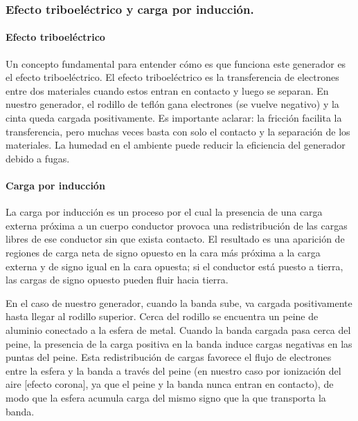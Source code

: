 \documentclass[12pt]{article}
\begin{document}
\subsubsection*{Efecto triboeléctrico y carga por inducción.}
\paragraph*{Efecto triboeléctrico}\mbox{}

Un concepto fundamental para entender cómo es que funciona este generador es el efecto triboeléctrico. El efecto triboeléctrico es la transferencia de electrones entre dos materiales cuando estos entran en contacto y luego se separan. En nuestro generador, el rodillo de teflón gana electrones (se vuelve negativo) y la cinta queda cargada positivamente. Es importante aclarar: la fricción facilita la transferencia, pero muchas veces basta con solo el contacto y la separación de los materiales. La humedad en el ambiente puede reducir la eficiencia del generador debido a fugas.

\paragraph*{Carga por inducción}\mbox{}
La carga por inducción es un proceso por el cual la presencia de una carga externa próxima a un cuerpo conductor provoca una redistribución de las cargas libres de ese conductor sin que exista contacto. El resultado es una aparición de regiones de carga neta de signo opuesto en la cara más próxima a la carga externa y de signo igual en la cara opuesta; si el conductor está puesto a tierra, las cargas de signo opuesto pueden fluir hacia tierra.

En el caso de nuestro generador, cuando la banda sube, va cargada positivamente hasta llegar al rodillo superior. Cerca del rodillo se encuentra un peine de aluminio conectado a la esfera de metal. Cuando la banda cargada pasa cerca del peine, la presencia de la carga positiva en la banda induce cargas negativas en las puntas del peine. Esta redistribución de cargas favorece el flujo de electrones entre la esfera y la banda a través del peine (en nuestro caso por ionización del aire [efecto corona], ya que el peine y la banda nunca entran en contacto), de modo que la esfera acumula carga del mismo signo que la que transporta la banda.
\end{document}
